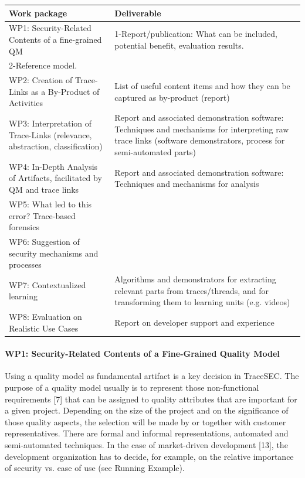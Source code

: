 \begin{tabular}{|p{6cm}|p{10cm}|}
	\hline 
	\textbf{Work package} & \textbf{Deliverable} \\ 
	\hline 
	WP1: Security-Related Contents of a fine-grained QM & 1-Report/publication: What can be included, potential benefit, evaluation results.\\
	2-Reference model. \\ 
	\hline 
	WP2: Creation of Trace-Links as a By-Product of Activities & List of useful content items and how they can be captured as by-product (report) \\ 
	\hline 
	WP3: Interpretation of Trace-Links (relevance, abstraction, classification) & Report and associated demonstration software: Techniques and mechanisms for interpreting raw trace links (software demonstrators, process for semi-automated parts) \\ 
	\hline 
	WP4: In-Depth Analysis of Artifacts, facilitated by QM and trace links & Report and associated demonstration software: Techniques and mechanisms for analysis \\ 
	\hline 
	WP5: What led to this error? Trace-based forensics &  \\ 
	\hline 
	WP6: Suggestion of security mechanisms and processes &  \\ 
	\hline 
	WP7: Contextualized learning & Algorithms and demonstrators for extracting relevant parts from traces/threads, and for transforming them to learning units (e.g. videos) \\ 
	\hline 
	WP8: Evaluation on Realistic Use Cases & Report on developer support and experience \\ 
	\hline 
\end{tabular} 

\paragraph*{WP1: Security-Related Contents of a Fine-Grained Quality Model}
Using a quality model as fundamental artifact is a key decision in TraceSEC. The purpose of a quality model usually is to represent those non-functional requirements [7] that can be assigned to quality attributes that are important for a given project. Depending on the size of the project and on the significance of those quality aspects, the selection will be made by or together with customer representatives. There are formal and informal representations, automated and semi-automated techniques. In the case of market-driven development [13], the development organization has to decide, for example, on the relative importance of security vs. ease of use (see Running Example). 

